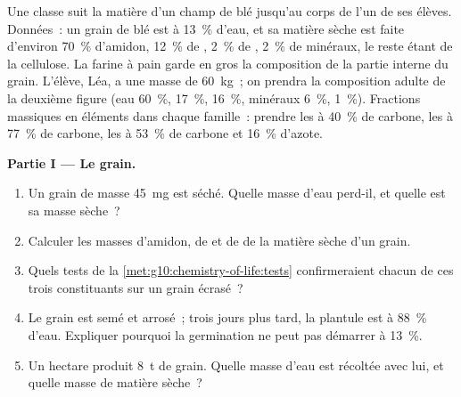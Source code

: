 \begin{problem}
\label{pb:g10:chemistry-of-life:1}
Une classe suit la matière d'un champ de blé jusqu'au corps de l'un de
ses élèves. Données~: un grain de blé est à 13~\% d'eau, et sa matière
sèche est faite d'environ 70~\% d'amidon, 12~\% de , 2~\% de
, 2~\% de minéraux, le reste étant de la cellulose. La farine à
pain garde en gros la composition de la partie interne du grain.
L'élève, Léa, a une masse de \qty{60}{kg}~; on prendra la composition
adulte de la deuxième figure (eau 60~\%,  17~\%, 
16~\%, minéraux 6~\%,  1~\%). Fractions massiques en éléments
dans chaque famille~: prendre les  à 40~\% de carbone, les
 à 77~\% de carbone, les  à 53~\% de carbone et 16~\%
d'azote.

\medskip
\noindent\textbf{Partie I --- Le grain.}
\begin{enumerate}
  \item Un grain de masse \qty{45}{mg} est séché. Quelle masse d'eau
        perd-il, et quelle est sa masse sèche~?
  \item Calculer les masses d'amidon, de  et de  de la
        matière sèche d'un grain.
  \item Quels tests de la \cref{met:g10:chemistry-of-life:tests}
        confirmeraient chacun de ces trois constituants sur un grain
        écrasé~?
  \item Le grain est semé et arrosé~; trois jours plus tard, la
        plantule est à 88~\% d'eau. Expliquer pourquoi la germination
        ne peut pas démarrer à 13~\%.
  \item Un hectare produit \qty{8}{t} de grain. Quelle masse d'eau
        est récoltée avec lui, et quelle masse de matière sèche~?
\end{enumerate}


\end{problem}
